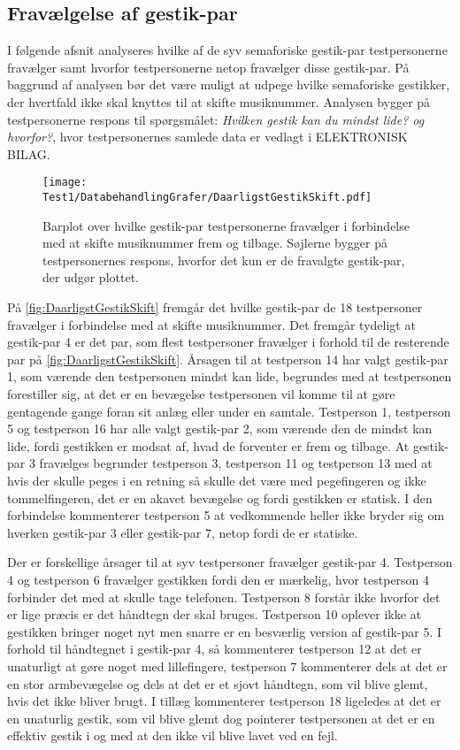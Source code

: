 \subsection{Fravælgelse af gestik-par}
\label{TestresultaterSkiftDaarlig}
%
I følgende afsnit analyseres hvilke af de syv semaforiske gestik-par testpersonerne fravælger samt hvorfor testpersonerne netop fravælger disse gestik-par. På baggrund af analysen bør det være muligt at udpege hvilke semaforiske gestikker, der hvertfald ikke skal knyttes til at skifte musiknummer. Analysen bygger på testpersonerne respons til spørgsmålet: \textit{Hvilken gestik kan du mindst lide? og hvorfor?}, hvor testpersonernes samlede data er vedlagt i ELEKTRONISK BILAG.
%
\begin{figure}[H]
	\centering
	\texttt{[image: Test1/DatabehandlingGrafer/DaarligstGestikSkift.pdf]}
	\caption{Barplot over hvilke gestik-par testpersonerne fravælger i forbindelse med at skifte musiknummer frem og tilbage. Søjlerne bygger på testpersonernes respons, hvorfor det kun er de fravalgte gestik-par, der udgør plottet.}
	\label{fig:DaarligstGestikSkift}
\end{figure}
\noindent
%
På \autoref{fig:DaarligstGestikSkift} fremgår det hvilke gestik-par de 18 testpersoner fravælger i forbindelse med at skifte musiknummer. Det fremgår tydeligt at gestik-par 4 er det par, som flest testpersoner fravælger i forhold til de resterende par på \autoref{fig:DaarligstGestikSkift}. Årsagen til at testperson 14 har valgt gestik-par 1, som værende den testpersonen mindst kan lide, begrundes med at testpersonen forestiller sig, at det er en bevægelse testpersonen vil komme til at gøre gentagende gange foran sit anlæg eller under en samtale. Testperson 1, testperson 5 og testperson 16 har alle valgt gestik-par 2, som værende den de mindst kan lide, fordi gestikken er modsat af, hvad de forventer er frem og tilbage. At gestik-par 3 fravælges begrunder testperson 3, testperson 11 og testperson 13 med at hvis der skulle peges i en retning så skulle det være med pegefingeren og ikke tommelfingeren, det er en akavet bevægelse og fordi gestikken er statisk. I den forbindelse kommenterer testperson 5 at vedkommende heller ikke bryder sig om hverken gestik-par 3 eller gestik-par 7, netop fordi de er statiske.

Der er forskellige årsager til at syv testpersoner fravælger gestik-par 4. Testperson 4 og testperson 6 fravælger gestikken fordi den er mærkelig, hvor testperson 4 forbinder det med at skulle tage telefonen. Testperson 8 forstår ikke hvorfor det er lige præcis er det håndtegn der skal bruges. Testperson 10 oplever ikke at gestikken bringer noget nyt men snarre er en besværlig version af gestik-par 5. I forhold til håndtegnet i gestik-par 4, så kommenterer testperson 12 at det er unaturligt at gøre noget med lillefingere, testperson 7 kommenterer dels at det er en stor armbevægelse og dels at det er et sjovt håndtegn, som vil blive glemt, hvis det ikke bliver brugt. I tillæg kommenterer testperson 18 ligeledes at det er en unaturlig gestik, som vil blive glemt dog pointerer testpersonen at det er en effektiv gestik i og med at den ikke vil blive lavet ved en fejl. 

